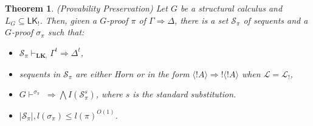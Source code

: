 \documentclass[12pt,a4paper]{article}
\theoremstyle{plain}
\newtheorem{theorem}{Theorem}
\theoremstyle{definition}
\newcommand{\LKajab}{\mathbf{LK_!}}
\begin{document}
\begin{theorem}(Provability Preservation) \label{MainTheorem}
Let $G$ be a structural calculus and $L_G \subseteq \mathsf{LK_!}$. Then,
given a $G$-proof $\pi$ of $\Gamma \Rightarrow \Delta$, there is a set $\mathcal{S}_{\pi}$ of sequents and a $G$-proof $\sigma_{\pi}$ such that:
\begin{itemize}
\item[$(i)$]
$\mathcal{S}_{\pi} \vdash_{\LKajab} \Gamma^t \Rightarrow  \Delta^t$,
\item[$(ii)$]
sequents in $\mathcal{S}_{\pi}$ are either Horn or in the form $\langle ! A \rangle \Rightarrow ! \langle ! A \rangle$ when $\mathcal{L}=\mathcal{L}_!$,
\item[$(iii)$]
$G\vdash^{\sigma_{\pi}} \; \Rightarrow \bigwedge I(\mathcal{S}_{\pi}^{s})$, where $s$ is the standard substitution.
\item[$(iv)$]
$|\mathcal{S}_{\pi}|, l(\sigma_{\pi}) \leq l(\pi)^{O(1)}$.
\end{itemize}
\end{theorem}
\end{document}
